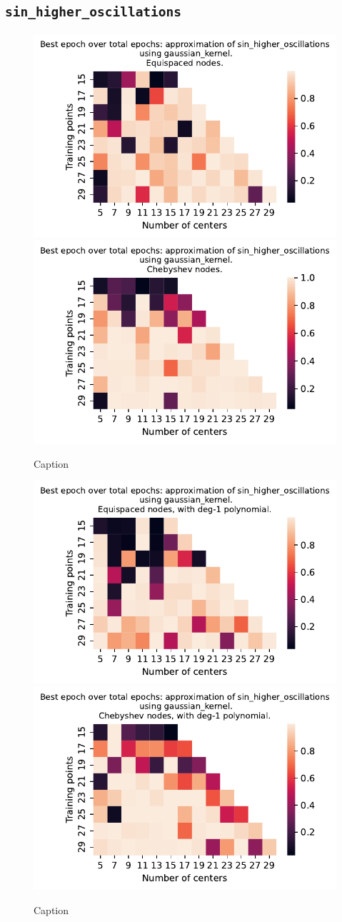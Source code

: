 \documentclass[12pt]{report} %
\begin{document}
\clearpage 
\subsection*{\texttt{sin\_higher\_oscillations}}

\begin{figure}[ht]
    \centering
    
    \includegraphics[width=.49\textwidth]{imagenes/experiments/1d/variational_epochs/sin_higher_oscillations-Kgaussian_kernel-Equi-epochs.pdf}
    \includegraphics[width=.49\textwidth]{imagenes/experiments/1d/variational_epochs/sin_higher_oscillations-Kgaussian_kernel-Cheb-epochs.pdf}
    \caption{Caption}
    \label{fig:epochs-sin-higher-oscillations-gaussian}
\end{figure}

\begin{figure}[ht]
    \centering
    
    \includegraphics[width=.49\textwidth]{imagenes/experiments/1d/variational_epochs/sin_higher_oscillations-Kgaussian_kernel-Poly-Equi-epochs.pdf}
    \includegraphics[width=.49\textwidth]{imagenes/experiments/1d/variational_epochs/sin_higher_oscillations-Kgaussian_kernel-Poly-Cheb-epochs.pdf}
    \caption{Caption}
    \label{fig:epochs-sin-higher-oscillations-gaussian-poly}
\end{figure}
\end{document}

